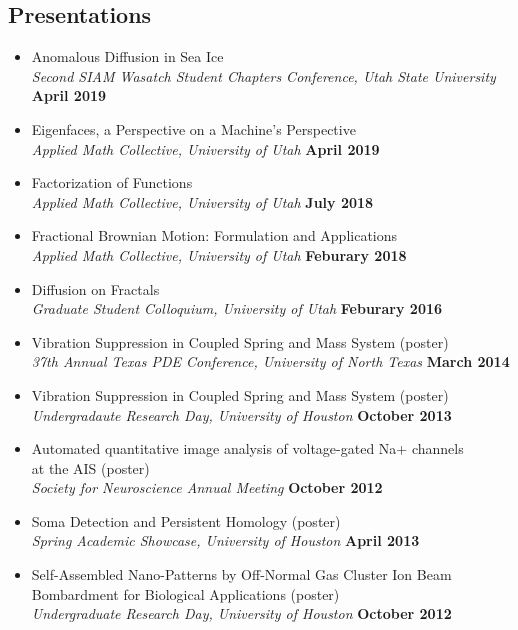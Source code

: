 \documentclass[margin,line]{res}
\begin{document}
\begin{resume}
\section{\sc Presentations}
\begin{itemize}
    \item[] Anomalous Diffusion in Sea Ice
        \\{\it Second SIAM Wasatch Student Chapters Conference, Utah State University} \hfill {\bf April 2019} 
    \item[] Eigenfaces, a Perspective on a Machine's Perspective
        \\{\it Applied Math Collective, University of Utah} \hfill {\bf April 2019}
    \item[] Factorization of Functions
        \\ {\it Applied Math Collective, University of Utah } \hfill {\bf July 2018} 
    \item[] Fractional Brownian Motion: Formulation and Applications
        \\ {\it Applied Math Collective, University of Utah} \hfill {\bf Feburary 2018} 
    \item[] Diffusion on Fractals
        \\ {\it Graduate Student Colloquium, University of Utah} \hfill {\bf Feburary 2016} 
    \item[] Vibration Suppression in Coupled Spring and Mass System (poster)
        \\ {\it 37th Annual Texas PDE Conference, University of North Texas} \hfill {\bf March 2014} 
    \item[] Vibration Suppression in Coupled Spring and Mass System (poster)
        \\ {\it Undergradaute Research Day, University of Houston} \hfill {\bf October 2013} 
    \item[] Automated quantitative image analysis of voltage-gated Na+ channels \\ at the AIS (poster) 
    \\ {\it Society for Neuroscience Annual Meeting} \hfill {\bf October 2012} 
    \item[] Soma Detection and Persistent Homology (poster) 
    \\ {\it Spring Academic Showcase, University of Houston} \hfill {\bf April 2013} 
    \item[] Self-Assembled Nano-Patterns by Off-Normal Gas Cluster  Ion Beam \\ Bombardment for Biological Applications (poster) 
    \\ {\it Undergraduate Research Day, University of Houston} \hfill {\bf October 2012} 
\end{itemize}


\end{resume}
\end{document}
